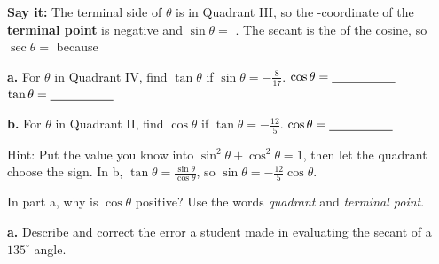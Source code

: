 \vspace{6pt}

\vspace{4pt}
\textbf{Say it:} The terminal side of $\theta$ is in Quadrant III, so the \blank[1.2cm]-coordinate of the \textbf{terminal point} is negative and $\sin\theta=$ \blank[1.4cm]. The secant is the \blank[2cm] of the cosine, so $\sec\theta=$ \blank[1.4cm] because \lines[1]

\newpage
{}
\begin{minipage}[t]{0.48\textwidth}
\textbf{a.} For $\theta$ in Quadrant IV, find $\tan\theta$ if $\sin\theta=-\frac8{17}$.
\lines[4]
\vspace{6pt}
$\cos\theta=\blank[1.8cm]$\qquad $\tan\theta=\blank[1.8cm]$
\end{minipage}\hfill
\begin{minipage}[t]{0.48\textwidth}
\textbf{b.} For $\theta$ in Quadrant II, find $\cos\theta$ if $\tan\theta=-\frac{12}{5}$.
\lines[4]
\vspace{6pt}
$\cos\theta=\blank[1.8cm]$
\end{minipage}

\vspace{4pt}
Hint: Put the value you know into $\sin^2\theta+\cos^2\theta=1$, then let the quadrant choose the sign. In b, $\tan\theta=\frac{\sin\theta}{\cos\theta}$, so $\sin\theta=-\frac{12}{5}\cos\theta$.

\vspace{4pt}
In part a, why is $\cos\theta$ positive? Use the words \emph{quadrant} and \emph{terminal point}.\lines[2]

\textbf{a.} Describe and correct the error a student made in evaluating the secant of a $135^\circ$ angle.


